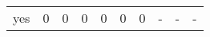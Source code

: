 \begin{longtable}{lp{2.0cm}p{2.0cm}p{2.0cm}p{2.0cm}p{2.0cm}p{2.0cm}p{2.0cm}p{2.0cm}p{2.0cm}}
yes       &                      0 &                                             0 &                                            0 &                                           0 &                                            0 &                                          0 &                                    - &                                      - &                                    - \\
\end{longtable}
